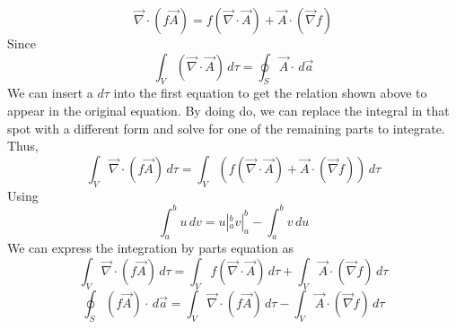 \documentclass{article}
\begin{document}
$$\vec{\nabla} \cdot (f \vec{A}) = f(\vec{\nabla} \cdot \vec{A}) + \vec{A} \cdot (\vec{\nabla} f)$$
Since
$$\int_{V} (\vec{\nabla} \cdot \vec{A}) \, d \tau = \oint_{S} \vec{A} \cdot \, d\vec{a}$$
We can insert a $d \tau$ into the first equation to get the relation shown above to appear in the original equation. By doing do, we can replace the integral in that spot with a different form and solve for one of the remaining parts to integrate. Thus,
$$\int_{V} \vec{\nabla} \cdot (f \vec{A}) \, d \tau = \int_{V} (f(\vec{\nabla} \cdot \vec{A}) + \vec{A} \cdot (\vec{\nabla} f)) \, d \tau$$
Using
$$\int_{a}^{b} u \, dv = u |_{a}^{b} v |_{a}^{b} - \int_{a}^{b} v \, du$$
We can express the integration by parts equation as
$$\int_{V} \vec{\nabla} \cdot (f \vec{A}) \, d \tau = \int_{V} f(\vec{\nabla} \cdot \vec{A}) \, d \tau + \int_{V} \vec{A} \cdot (\vec{\nabla} f) \, d \tau$$
$$\oint_{S} (f \vec{A}) \cdot \, d \vec{a} = \int_{V} \vec{\nabla} \cdot (f \vec{A}) \, d \tau - \int_{V} \vec{A} \cdot (\vec{\nabla} f) \, d \tau$$
\end{document}
